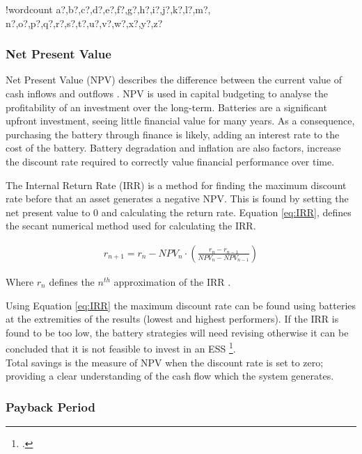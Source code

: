 \documentclass[fontsize=9.5pt]{extarticle}
\numberwithin{figure}{section} %
\newcounter{words}
\newenvironment{counted}{%
  \setcounter{words}{0}
  \SearchList!{wordcount}{\stepcounter{words}}
    {a?,b?,c?,d?,e?,f?,g?,h?,i?,j?,k?,l?,m?,
    n?,o?,p?,q?,r?,s?,t?,u?,v?,w?,x?,y?,z?}
  \UndoBoundary{'}
  \SearchOrder{p;}}{%
  \StopSearching}
\begin{document}
\begin{counted}
\subsubsection{Net Present Value}\label{net-present-value}

Net Present Value (NPV) describes the difference between the current
value of cash inflows and outflows \cite{NetPrese35:online}. NPV is used
in capital budgeting to analyse the profitability of an investment over
the long-term. Batteries are a significant upfront investment, seeing
little financial value for many years. As a consequence, purchasing the
battery through finance is likely, adding an interest rate to the cost
of the battery. Battery degradation and inflation are also factors,
increase the discount rate required to correctly value financial
performance over time.

The Internal Return Rate (IRR) is a method for finding the maximum
discount rate before that an asset generates a negative NPV. This is
found by setting the net present value to 0 and calculating the return
rate. Equation \ref{eq:IRR}, defines the secant numerical method used
for calculating the IRR.

\begin{align}
r_{ n+1 }=r_{ n }-{ NPV }_{ n }\cdot \left( \frac { r_{ n }-r_{ n-1 } }{ { NPV }_{ n }-{ NPV }_{ n-1 } }  \right)
\label{eq:IRR}
\end{align}

Where \(r_{ n }\) defines the \(n^{th}\) approximation of the IRR
\cite{xxxdvi44:online}.

Using Equation \ref{eq:IRR} the maximum discount rate can be found using
batteries at the extremities of the results (lowest and highest
performers). If the IRR is found to be too low, the battery strategies
will need revising otherwise it can be concluded that it is not feasible
to invest in an ESS
\footcite[An IRR below 5\% is considered unfeasible, although unquantified benefits may be present][]{diorio2015economic}.\\
Total savings is the measure of NPV when the discount rate is set to
zero; providing a clear understanding of the cash flow which the system
generates.

\subsubsection{Payback Period}\label{payback-period}


\end{counted}
\end{document}
